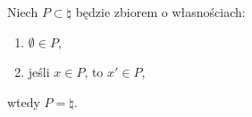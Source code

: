\begin{theorem}[o indukcji]
    Niech \( P \subset \natural \) będzie zbiorem o własnościach:
    \begin{enumerate}
        \item \( \emptyset \in P \),
        \item jeśli \( x \in P \), to \( x' \in P \),
    \end{enumerate}
    wtedy \( P = \natural \).
\end{theorem}